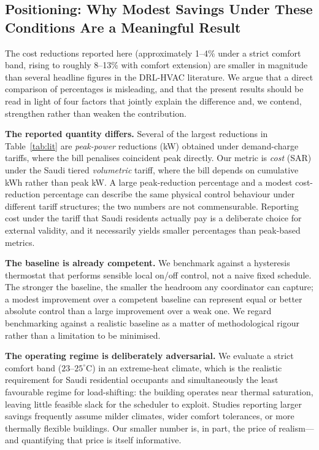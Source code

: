 \documentclass[12pt,a4paper]{article}
\begin{document}
\subsection{Positioning: Why Modest Savings Under These Conditions Are a Meaningful Result}
\label{sec:positioning}

The cost reductions reported here (approximately 1--4\% under a strict comfort band, rising to roughly 8--13\% with comfort extension) are smaller in magnitude than several headline figures in the DRL-HVAC literature. We argue that a direct comparison of percentages is misleading, and that the present results should be read in light of four factors that jointly explain the difference and, we contend, strengthen rather than weaken the contribution.

\textbf{The reported quantity differs.} Several of the largest reductions in Table~\ref{tab:lit} are \emph{peak-power} reductions (kW) obtained under demand-charge tariffs, where the bill penalises coincident peak directly. Our metric is \emph{cost} (SAR) under the Saudi tiered \emph{volumetric} tariff, where the bill depends on cumulative kWh rather than peak kW. A large peak-reduction percentage and a modest cost-reduction percentage can describe the same physical control behaviour under different tariff structures; the two numbers are not commensurable. Reporting cost under the tariff that Saudi residents actually pay is a deliberate choice for external validity, and it necessarily yields smaller percentages than peak-based metrics.

\textbf{The baseline is already competent.} We benchmark against a hysteresis thermostat that performs sensible local on/off control, not a naive fixed schedule. The stronger the baseline, the smaller the headroom any coordinator can capture; a modest improvement over a competent baseline can represent equal or better absolute control than a large improvement over a weak one. We regard benchmarking against a realistic baseline as a matter of methodological rigour rather than a limitation to be minimised.

\textbf{The operating regime is deliberately adversarial.} We evaluate a strict comfort band ($23$--$25^\circ$C) in an extreme-heat climate, which is the realistic requirement for Saudi residential occupants and simultaneously the least favourable regime for load-shifting: the building operates near thermal saturation, leaving little feasible slack for the scheduler to exploit. Studies reporting larger savings frequently assume milder climates, wider comfort tolerances, or more thermally flexible buildings. Our smaller number is, in part, the price of realism---and quantifying that price is itself informative.
\end{document}
